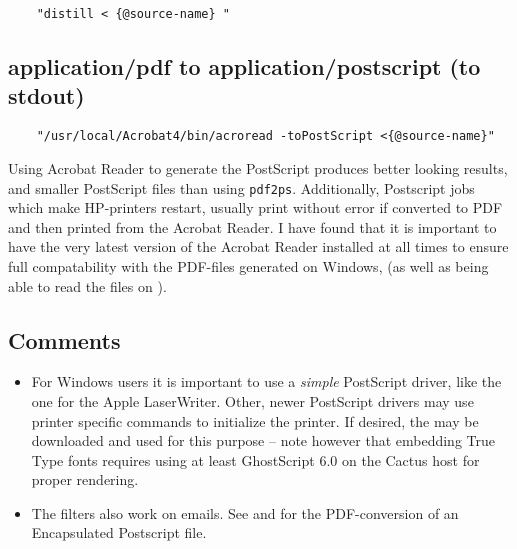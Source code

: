 \begin{verbatim}
    "distill < {@source-name} "
\end{verbatim}


\subsection*{application/pdf to application/postscript (to stdout)}

\begin{verbatim}
    "/usr/local/Acrobat4/bin/acroread -toPostScript <{@source-name}"
\end{verbatim}

Using Acrobat Reader to generate the PostScript produces better
looking results, and smaller PostScript files than using
\texttt{pdf2ps}.  Additionally, Postscript jobs which make HP-printers
restart, usually print without error if converted to PDF and then
printed from the Acrobat Reader.  I have found that it is important to
have the very latest version of the Acrobat Reader installed at all
times to ensure full compatability with the PDF-files generated on
Windows, (as well as being able to read the files on
).

\subsection*{Comments}

\begin{itemize}
\item For Windows users it is important to use a \textit{simple}
  PostScript driver, like the one for the Apple LaserWriter.  Other,
  newer PostScript drivers may use printer specific commands to
  initialize the printer.  If desired, the
   may be downloaded and used for this
  purpose -- note however that embedding True Type fonts requires
  using at least GhostScript 6.0 on the Cactus host for proper
  rendering.
   
\item The filters also work on emails.  See
   and
   for the PDF-conversion
  of an Encapsulated Postscript file.

\end{itemize}

